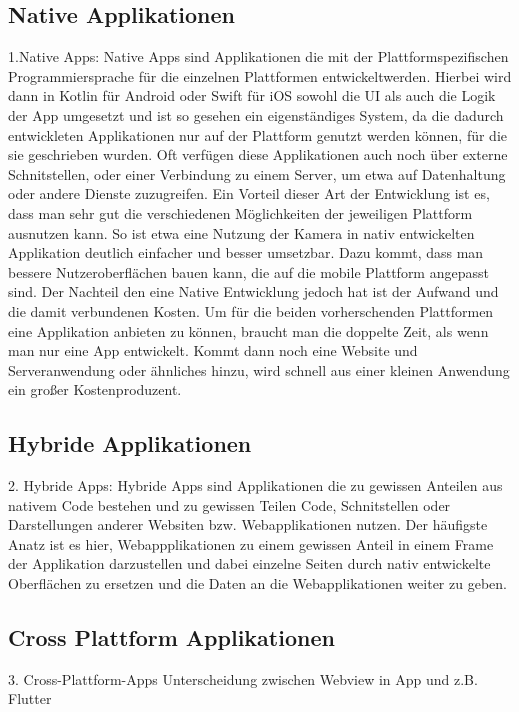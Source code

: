 \subsection{Native Applikationen}
1.Native Apps:
Native Apps sind Applikationen die mit der Plattformspezifischen Programmiersprache für die einzelnen Plattformen entwickeltwerden. Hierbei wird dann in Kotlin für Android oder Swift für iOS sowohl die UI als auch die Logik der App umgesetzt und ist so gesehen ein eigenständiges System, da die dadurch entwickleten Applikationen nur auf der Plattform genutzt werden können, für die sie geschrieben wurden.
Oft verfügen diese Applikationen auch noch über externe Schnitstellen, oder einer Verbindung zu einem Server, um etwa auf Datenhaltung oder andere Dienste zuzugreifen.
Ein Vorteil dieser Art der Entwicklung ist es, dass man sehr gut die verschiedenen Möglichkeiten der jeweiligen Plattform ausnutzen kann. So ist etwa eine Nutzung der Kamera in nativ entwickelten Applikation deutlich einfacher und besser umsetzbar. Dazu kommt, dass man bessere Nutzeroberflächen bauen kann, die auf die mobile Plattform angepasst sind.
Der Nachteil den eine Native Entwicklung jedoch hat ist der Aufwand und die damit verbundenen Kosten. Um für die beiden vorherschenden Plattformen eine Applikation anbieten zu können, braucht man die doppelte Zeit, als wenn man nur eine App entwickelt. Kommt dann noch eine Website und Serveranwendung oder ähnliches hinzu, wird schnell aus einer kleinen Anwendung ein großer Kostenproduzent.
\subsection{Hybride Applikationen}
2. Hybride Apps:
Hybride Apps sind Applikationen die zu gewissen Anteilen aus nativem Code bestehen und zu gewissen Teilen Code, Schnitstellen oder Darstellungen anderer Websiten bzw. Webapplikationen nutzen. Der häufigste Anatz ist es hier, Webappplikationen zu einem gewissen Anteil in einem Frame der Applikation darzustellen und dabei einzelne Seiten durch nativ entwickelte Oberflächen zu ersetzen und die Daten an die Webapplikationen weiter zu geben. 

\subsection{Cross Plattform Applikationen}
3. Cross-Plattform-Apps
Unterscheidung zwischen Webview in App und z.B. Flutter 
